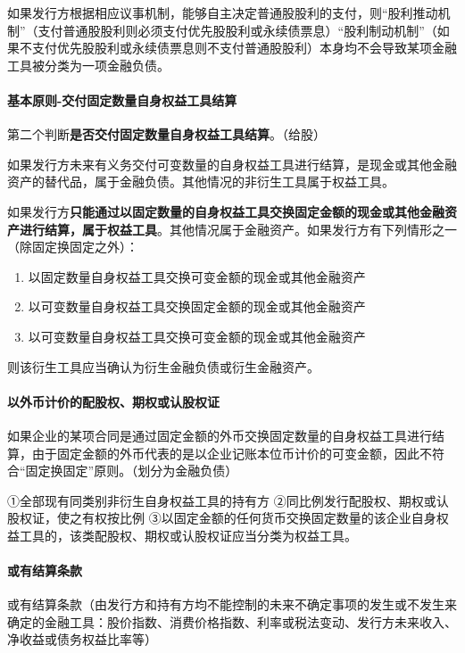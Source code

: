 \documentclass[UTF8,12pt]{ctexart}
\numberwithin{equation}{section} %
\numberwithin{figure}{section}
\numberwithin{table}{section}
\begin{document}
	如果发行方根据相应议事机制，能够自主决定普通股股利的支付，则“股利推动机制”（支付普通股股利则必须支付优先股股利或永续债票息）“股利制动机制”（如果不支付优先股股利或永续债票息则不支付普通股股利）本身均不会导致某项金融工具被分类为一项金融负债。
	
	\paragraph{基本原则-交付固定数量自身权益工具结算}
	第二个判断\textbf{是否交付固定数量自身权益工具结算}。（给股）
	
	如果发行方未来有义务交付可变数量的自身权益工具进行结算，是现金或其他金融资产的替代品，属于金融负债。其他情况的非衍生工具属于权益工具。
	
	如果发行方\textbf{只能通过以固定数量的自身权益工具交换固定金额的现金或其他金融资产进行结算，属于权益工具}。其他情况属于金融资产。如果发行方有下列情形之一（除固定换固定之外）：
	\begin{enumerate}
		\item 以固定数量自身权益工具交换可变金额的现金或其他金融资产
		
		\item 以可变数量自身权益工具交换固定金额的现金或其他金融资产
		
		\item 以可变数量自身权益工具交换可变金额的现金或其他金融资产
	\end{enumerate}
	则该衍生工具应当确认为衍生金融负债或衍生金融资产。
	
	
	\paragraph{以外币计价的配股权、期权或认股权证}
	如果企业的某项合同是通过固定金额的外币交换固定数量的自身权益工具进行结算，由于固定金额的外币代表的是以企业记账本位币计价的可变金额，因此不符合“固定换固定”原则。（划分为金融负债）
	
	
	①全部现有同类别非衍生自身权益工具的持有方
	②同比例发行配股权、期权或认股权证，使之有权按比例
	③以固定金额的任何货币交换固定数量的该企业自身权益工具的，该类配股权、期权或认股权证应当分类为权益工具。
	
	\paragraph{或有结算条款}
	
	或有结算条款（由发行方和持有方均不能控制的未来不确定事项的发生或不发生来确定的金融工具：股价指数、消费价格指数、利率或税法变动、发行方未来收入、净收益或债务权益比率等）
	
\end{document}
